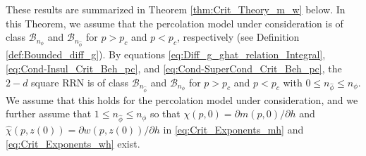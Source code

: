 \documentclass[english,12pt,jmp,graphicx]{revtex4-1}
\newcommand{\ph}{\hat{\phi}}
\begin{document}
These results are summarized in Theorem \ref{thm:Crit_Theory_m_w}
below. In this Theorem, we assume that the percolation model under
consideration is of class $\mathcal{B}_{n_\phi}$ 
and $\mathcal{B}_{n_{\ph}}$ for $p>p_c$ and $p<p_c$, respectively (see
Definition \ref{def:Bounded_diff_g}).  
By equations \eqref{eq:Diff_g_ghat_relation_Integral},
\eqref{eq:Cond-Insul_Crit_Beh_pc}, and
\eqref{eq:Cond-SuperCond_Crit_Beh_pc}, the $2-d$ square RRN is of
class $\mathcal{B}_{n_{\ph}}$ and $\mathcal{B}_{n_\phi}$ for $p>p_c$ and $p<p_c$ 
with $0\leq n_{\ph}\leq n_\phi$. We assume that this holds for the percolation
model under consideration, and we further assume that $1\leq n_{\ph}\leq
n_\phi$ so that $\chi(p,0)=\partial m(p,0)/\partial h$ and $\hat{\chi}(p,z(0))=\partial w(p,z(0))/\partial h$
in \eqref{eq:Crit_Exponents_mh} and \eqref{eq:Crit_Exponents_wh} exist.   
%
\end{document}
